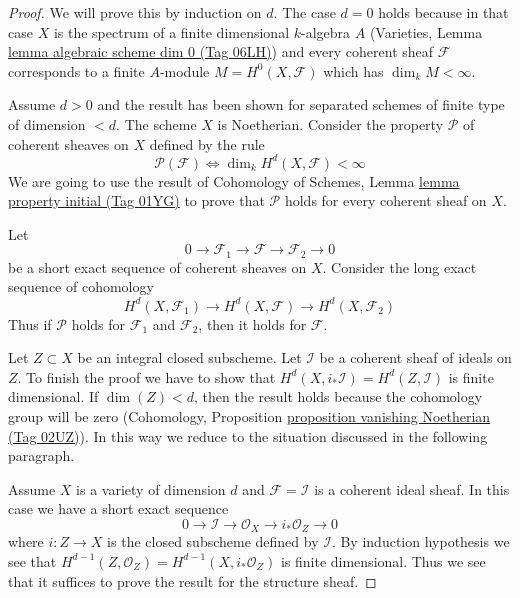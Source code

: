 \documentclass{amsart}
\theoremstyle{plain}
\theoremstyle{definition}
\theoremstyle{remark}
\numberwithin{equation}{subsection}
\begin{document}
\begin{proof}
We will prove this by induction on $d$. The case $d = 0$ holds because
in that case $X$ is the spectrum of a finite dimensional $k$-algebra $A$
(Varieties, Lemma \href{https://stacks.math.columbia.edu/tag/06LH}{lemma algebraic scheme dim 0 (Tag 06LH)})
and every coherent sheaf $\mathcal{F}$ corresponds to a finite $A$-module
$M = H^0(X, \mathcal{F})$ which has $\dim_k M < \infty$.

\medskip\noindent
Assume $d > 0$ and the result has been shown for separated schemes
of finite type of dimension $< d$. The scheme $X$ is Noetherian. Consider
the property $\mathcal{P}$ of coherent sheaves on $X$ defined by the rule
$$
\mathcal{P}(\mathcal{F}) \Leftrightarrow
\dim_k H^d(X, \mathcal{F}) < \infty
$$
We are going to use the result of
Cohomology of Schemes, Lemma \href{https://stacks.math.columbia.edu/tag/01YG}{lemma property initial (Tag 01YG)}
to prove that $\mathcal{P}$ holds for every coherent sheaf on $X$.

\medskip\noindent
Let
$$
0 \to \mathcal{F}_1 \to \mathcal{F} \to \mathcal{F}_2 \to 0
$$
be a short exact sequence of coherent sheaves on $X$.
Consider the long exact sequence of cohomology
$$
H^d(X, \mathcal{F}_1) \to
H^d(X, \mathcal{F}) \to
H^d(X, \mathcal{F}_2)
$$
Thus if $\mathcal{P}$ holds for $\mathcal{F}_1$ and $\mathcal{F}_2$,
then it holds for $\mathcal{F}$.

\medskip\noindent
Let $Z \subset X$ be an integral closed subscheme. Let $\mathcal{I}$
be a coherent sheaf of ideals on $Z$. To finish the proof we have to show
that $H^d(X, i_*\mathcal{I}) = H^d(Z, \mathcal{I})$ is finite dimensional.
If $\dim(Z) < d$, then the result holds because the cohomology group
will be zero (Cohomology, Proposition
\href{https://stacks.math.columbia.edu/tag/02UZ}{proposition vanishing Noetherian (Tag 02UZ)}).
In this way we reduce to the situation discussed in the following paragraph.

\medskip\noindent
Assume $X$ is a variety of dimension $d$ and 
$\mathcal{F} = \mathcal{I}$ is a coherent ideal sheaf. In this
case we have a short exact sequence
$$
0 \to \mathcal{I} \to \mathcal{O}_X \to i_*\mathcal{O}_Z \to 0
$$
where $i : Z \to X$ is the closed subscheme defined by $\mathcal{I}$.
By induction hypothesis we see that
$H^{d - 1}(Z, \mathcal{O}_Z) = H^{d - 1}(X, i_*\mathcal{O}_Z)$ is
finite dimensional. Thus we see that it suffices to prove the result
for the structure sheaf.


\end{proof}
\end{document}
